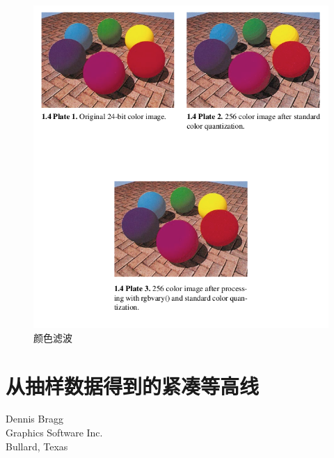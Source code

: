 \begin{CJK}{UTF8}{gbsn}
\begin{figure}[htbp]%
  \centering
  \includegraphics[totalheight=5in]{./fig/1.4.png}
  \caption{颜色滤波} 
  \label{fig:1.4}
\end{figure}

\newpage
\section{从抽样数据得到的紧凑等高线}
\begin{center}
\small{
Dennis Bragg\\
Graphics Software Inc.\\
Bullard, Texas}
\end{center}



\end{CJK}
